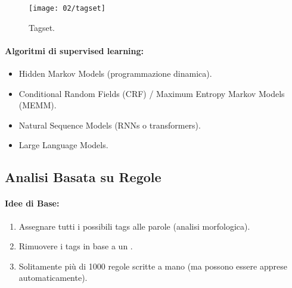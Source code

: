 \begin{figure}[h]
    \centering
    \texttt{[image: 02/tagset]}
    \caption{Tagset.}
\end{figure}


\paragraph{Algoritmi di supervised learning:}

\begin{itemize}
  \item Hidden Markov Models (programmazione dinamica). 
  \item Conditional Random Fields (CRF) / Maximum Entropy Markov Models (MEMM). 
  \item Natural Sequence Models (RNNs o transformers). 
  \item Large Language Models.
\end{itemize}

\subsection{Analisi Basata su Regole}

\paragraph{Idee di Base:}

\begin{enumerate}
  \item Assegnare tutti i possibili tags alle parole (analisi morfologica). 
  \item Rimuovere i tags in base a un . 
  \item Solitamente più di 1000 regole scritte a mano (ma possono essere apprese automaticamente).
\end{enumerate}


